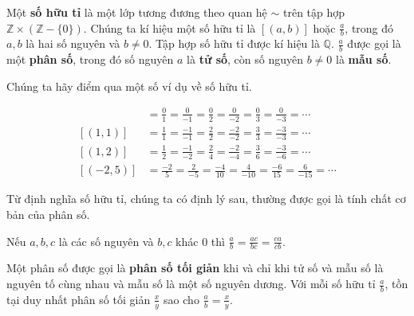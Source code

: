 \begin{definition}[Số hữu tỉ]
	Một \textbf{số hữu tỉ} là một lớp tương đương theo quan hệ $\sim$ trên tập hợp $\mathbb{Z}\times (\mathbb{Z} - \{0\})$. Chúng ta kí hiệu một số hữu tỉ là $[(a, b)]$ hoặc $\frac{a}{b}$, trong đó $a, b$ là hai số nguyên và $b\ne 0$. Tập hợp số hữu tỉ được kí hiệu là $\mathbb{Q}$.  $\frac{a}{b}$ được gọi là một \textbf{phân số}, trong đó số nguyên $a$ là \textbf{tử số}, còn số nguyên $b\ne 0$ là \textbf{mẫu số}.
\end{definition}

Chúng ta hãy điểm qua một số ví dụ về số hữu tỉ.
\begin{example}
	\begin{align*}
		[(0, 1)] & = \frac{0}{1} = \frac{0}{-1} = \frac{0}{2} = \frac{0}{-2} = \frac{0}{3} = \frac{0}{-3} = \cdots        \\
		[(1, 1)] & = \frac{1}{1} = \frac{-1}{-1} = \frac{2}{2} = \frac{-2}{-2} = \frac{3}{3} = \frac{-3}{-3} = \cdots     \\
		[(1, 2)] & = \frac{1}{2} = \frac{-1}{-2} = \frac{2}{4} = \frac{-2}{-4} = \frac{3}{6} = \frac{-3}{-6} = \cdots     \\
		[(-2,5)] & = \frac{-2}{5} = \frac{2}{-5} = \frac{-4}{10} = \frac{4}{-10} = \frac{-6}{15} = \frac{6}{-15} = \cdots
	\end{align*}
\end{example}

Từ định nghĩa số hữu tỉ, chúng ta có định lý sau, thường được gọi là tính chất cơ bản của phân số.
\begin{theorem}\label{theorem:fundamental-property-of-fraction}
	Nếu $a, b, c$ là các số nguyên và $b, c$ khác $0$ thì $\frac{a}{b} = \frac{ac}{bc} = \frac{ca}{cb}$.
\end{theorem}

\begin{theorem}
	Một phân số được gọi là \textbf{phân số tối giản} khi và chỉ khi tử số và mẫu số là nguyên tố cùng nhau và mẫu số là một số nguyên dương. Với mỗi số hữu tỉ $\frac{a}{b}$, tồn tại duy nhất phân số tối giản $\frac{x}{y}$ sao cho $\frac{a}{b} = \frac{x}{y}$.
\end{theorem}

